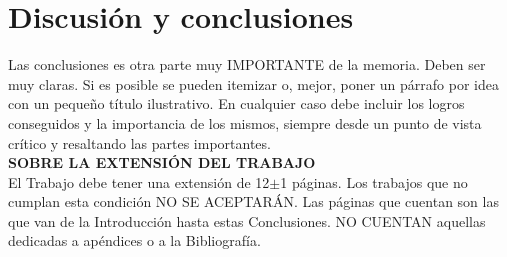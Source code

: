 \documentclass[11pt,a4paper,spanish]{book}
\begin{document}
\chapter{Discusión y conclusiones}

Las conclusiones es otra parte muy IMPORTANTE de la memoria. Deben ser muy claras. Si es posible se pueden itemizar o, mejor, poner un párrafo por idea con un pequeño título ilustrativo. En cualquier caso debe incluir los logros conseguidos y la importancia de los mismos, siempre desde un punto de vista crítico y resaltando las partes importantes.\\

\vspace{2cm}
{\bf{SOBRE LA EXTENSIÓN DEL TRABAJO}}\\

El Trabajo debe tener una extensión de 12$\pm$1 páginas. Los trabajos que no cumplan esta condición NO SE ACEPTARÁN. Las páginas que cuentan son las que van de la Introducción hasta estas Conclusiones. NO CUENTAN aquellas dedicadas a apéndices o a la Bibliografía.
\end{document}
